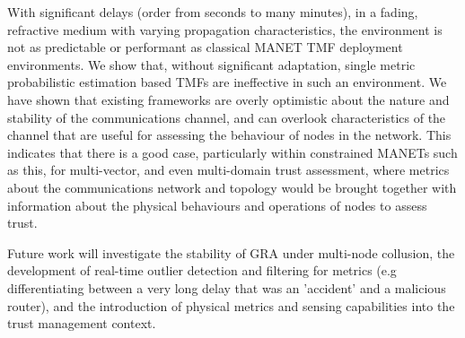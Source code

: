 \documentclass[conference]{IEEEtran}
\begin{document}
With significant delays (order from seconds to many minutes), in a fading, refractive medium with varying propagation characteristics, the environment is not as predictable or performant as classical MANET TMF deployment environments.
We show that, without significant adaptation, single metric probabilistic estimation based TMFs are ineffective in such an environment.
We have shown that existing frameworks are overly optimistic about the nature and stability of the communications channel, and can overlook characteristics of the channel that are useful for assessing the behaviour of nodes in the network. 
This indicates that there is a good case, particularly within constrained MANETs such as this, for multi-vector, and even multi-domain trust assessment, where metrics about the communications network and topology would be brought together with information about the physical behaviours and operations of nodes to assess trust.

Future work will investigate the stability of GRA under multi-node collusion, the development of real-time outlier detection and filtering for metrics (e.g differentiating between a very long delay that was an 'accident' and a malicious router), and the introduction of physical metrics and sensing capabilities into the trust management context.


%
%

\end{document}
